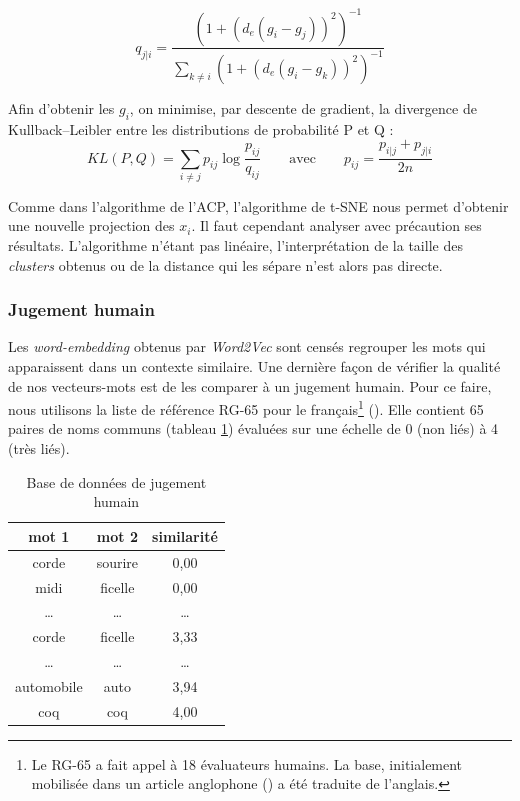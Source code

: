 \documentclass[11pt,french,french]{article}
\let\rmarkdownfootnote\footnote%
\def\footnote{\protect\rmarkdownfootnote}
\begin{document}
\[ q_{j|i} = \frac{(1+ (d_e(g_i - g_j))^2)^{-1}}{\sum_{k \neq i}{(1+ (d_e(g_i - g_k))^2)^{-1}}}\]

Afin d'obtenir les \(g_i\), on minimise, par descente de gradient, la divergence de Kullback--Leibler entre les distributions de probabilité P et Q :
\[KL(P,Q) = \sum_{i \neq j} { p_{ij} \log{\frac{p_{ij}}{q_{ij}}}} \qquad\text{avec}\qquad p_{ij} = \frac{p_{i|j} + p_{j|i}}{2n}\]

Comme dans l'algorithme de l'ACP, l'algorithme de t-SNE nous permet d'obtenir une nouvelle projection des \(x_i\). Il faut cependant analyser avec précaution ses résultats. L'algorithme n'étant pas linéaire, l'interprétation de la taille des \emph{clusters} obtenus ou de la distance qui les sépare n'est alors pas directe.

\hypertarget{sec:jugementHumain}{%
\subsubsection{Jugement humain}\label{sec:jugementHumain}}

Les \emph{word-embedding} obtenus par \emph{Word2Vec} sont censés regrouper les mots qui apparaissent dans un contexte similaire. Une dernière façon de vérifier la qualité de nos vecteurs-mots est de les comparer à un jugement humain. Pour ce faire, nous utilisons la liste de référence RG-65 pour le français\footnote{Le RG-65 a fait appel à 18 évaluateurs humains. La base, initialement mobilisée dans un article anglophone (\cite{Rubenstein}) a été traduite de l'anglais.} (\cite{Boumedyen}). Elle contient 65 paires de noms communs (tableau \ref{table:human_judgement}) évaluées sur une échelle de 0 (non liés) à 4 (très liés).

\begin{table}
\begin{center}
\begin{tabular}{|c|c|c|}
    \hline
    mot 1 & mot 2 & similarité  \tabularnewline
    \hline
    corde & sourire & 0,00   \tabularnewline
    midi & ficelle & 0,00   \tabularnewline
    \dots & \dots & \dots   \tabularnewline
    corde & ficelle & 3,33   \tabularnewline
    \dots & \dots & \dots   \tabularnewline
    automobile & auto & 3,94   \tabularnewline
    coq & coq & 4,00   \tabularnewline
    \hline
 \end{tabular}
\captionsetup{margin=0cm,format=hang,justification=justified}
\caption{Base de données de jugement humain}\label{table:human_judgement}
\end{center}
\end{table}
\end{document}
